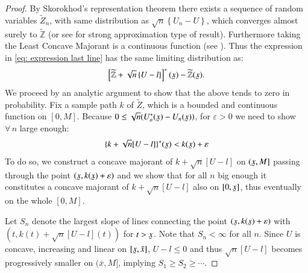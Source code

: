 \begin{proof}
By Skorokhod's representation theorem there exists a sequence of random variables $\widetilde{Z}_n$, with same distribution as $\sqrt{n} \left\{ U_n -U \right\}$, which converges almost surely to $\widetilde{\mathbb{Z}}$ (or see \cite{34} for strong approximation type of result). Furthermore taking the Least Concave Majorant is a continuous function (see \cite{35}). Thus the expression in \eqref{eq: expression last line} has the same limiting distribution as:
\begin{align*}
    \left[ \widetilde{\mathbb{Z}} + \sqrt{n} \left\{U - l \right\} \right]^*(\ubar{x}) - \widetilde{\mathbb{Z}}(\ubar{x}).
\end{align*}
We proceed by an analytic argument to show that the above tends to zero in probability. Fix a sample path  $k$ of $\widetilde{Z}$, which is a bounded and continuous function on $[0,M]$. Because $0 \leq \sqrt{n}(U^*_n(\ubar{x}) - U_n(\ubar{x}))$, for $\varepsilon > 0$ we need to show $\forall \, n$ large enough:
\begin{align}\label{eq: preceding display}
    \{k+\sqrt{n}[U-l]\}^*(\ubar{x})<k(\ubar{x})+\varepsilon
\end{align}
To do so, we construct a concave majorant of $k + \sqrt{n}[U-l]$ on $(\ubar{x},M]$ passing through the point $(\ubar{x},k(\ubar{x}) + \varepsilon)$ and we show that for all $n$ big enough it constitutes a concave majorant of $k+ \sqrt{n}[U-l]$ also on $[0,\ubar{x}]$, thus eventually on the whole $[0,M]$.

Let $S_n$ denote the largest slope of lines connecting the point $(\ubar{x}, k(\ubar{x})+\varepsilon)$ with $(t, k(t)+\sqrt{n}[U-l](t))$ for $t>\ubar{x}$. Note that $S_n<\infty$ for all $n$. Since $U$ is concave, increasing and linear on $[\ubar{x},\bar{x}]$, $U-l \leq 0$ and thus $\sqrt{n}[U-l]$ becomes progressively smaller on $(\bar{x},M]$, implying $S_1 \geq S_2 \geq \cdots$.
 

\end{proof}
